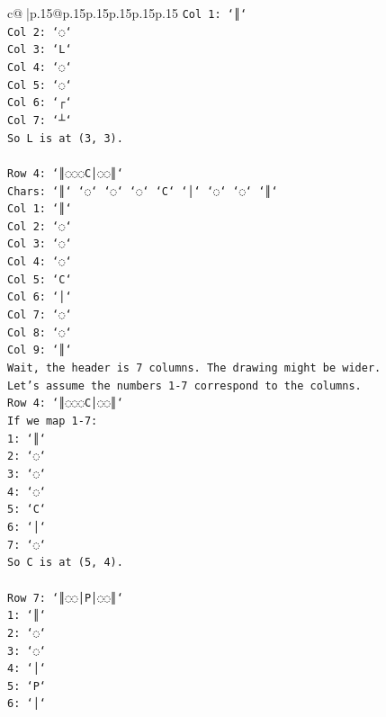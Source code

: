 \documentclass{article}
\begin{document}
{\begin{supertabular}{c@{$\;$}|p{.15\linewidth}@{}p{.15\linewidth}p{.15\linewidth}p{.15\linewidth}p{.15\linewidth}p{.15\linewidth}}
{{{\texttt{Col 1: `║`} \\
\texttt{Col 2: `◌`} \\
\texttt{Col 3: `L`} \\
\texttt{Col 4: `◌`} \\
\texttt{Col 5: `◌`} \\
\texttt{Col 6: `┌`} \\
\texttt{Col 7: `┴`} \\
\texttt{So L is at (3, 3).} \\
\\ 
\texttt{Row 4: `║◌◌◌C│◌◌║`} \\
\texttt{Chars: `║` `◌` `◌` `◌` `C` `│` `◌` `◌` `║`} \\
\texttt{Col 1: `║`} \\
\texttt{Col 2: `◌`} \\
\texttt{Col 3: `◌`} \\
\texttt{Col 4: `◌`} \\
\texttt{Col 5: `C`} \\
\texttt{Col 6: `│`} \\
\texttt{Col 7: `◌`} \\
\texttt{Col 8: `◌`} \\
\texttt{Col 9: `║`} \\
\texttt{Wait, the header is 7 columns. The drawing might be wider.} \\
\texttt{Let's assume the numbers 1{-}7 correspond to the columns.} \\
\texttt{Row 4: `║◌◌◌C│◌◌║`} \\
\texttt{If we map 1{-}7:} \\
\texttt{1: `║`} \\
\texttt{2: `◌`} \\
\texttt{3: `◌`} \\
\texttt{4: `◌`} \\
\texttt{5: `C`} \\
\texttt{6: `│`} \\
\texttt{7: `◌`} \\
\texttt{So C is at (5, 4).} \\
\\ 
\texttt{Row 7: `║◌◌│P│◌◌║`} \\
\texttt{1: `║`} \\
\texttt{2: `◌`} \\
\texttt{3: `◌`} \\
\texttt{4: `│`} \\
\texttt{5: `P`} \\
\texttt{6: `│`} \\
}}}
\end{supertabular}}
\end{document}
